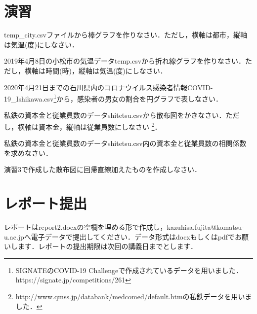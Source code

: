 \section{演習}

\practice
temp\_city.csvファイルから棒グラフを作りなさい．ただし，横軸は都市，縦軸は気温(度)にしなさい．

\practice
2019年4月8日の小松市の気温データtemp.csvから折れ線グラフを作りなさい．ただし，横軸は時間(時)，縦軸は気温(度)にしなさい．

\practice
2020年4月21日までの石川県内のコロナウイルス感染者情報COVID-19\_Ishikawa.csv\footnote{SIGNATEのCOVID-19 Challengeで作成されているデータを用いました．https://signate.jp/competitions/261}から，感染者の男女の割合を円グラフで表しなさい．

\practice
私鉄の資本金と従業員数のデータshitetsu.csvから散布図をかきなさい．ただし，横軸は資本金，縦軸は従業員数にしなさい
\footnote{http://www.qmss.jp/databank/medcomed/default.htmの私鉄データを用いました．}．

\practice
私鉄の資本金と従業員数のデータshitetsu.csv内の資本金と従業員数の相関係数を求めなさい．

\practice
演習3で作成した散布図に回帰直線加えたものを作成しなさい．

\section{レポート提出}

レポートはreport2.docxの空欄を埋める形で作成し，kazuhisa.fujita@komatsu-u.ac.jpへ電子データで提出してください．データ形式はdocxもしくはpdfでお願いします．レポートの提出期限は次回の講義日までとします．
